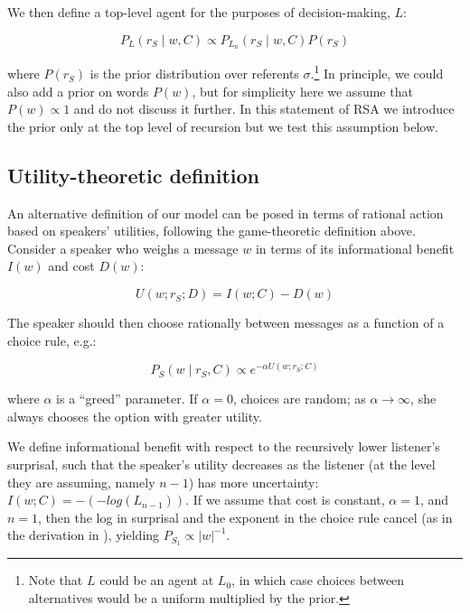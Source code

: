 \documentclass[man,noapacite]{apa2}
\begin{document}
We then define a top-level agent for the purposes of decision-making, $L$:

\begin{equation}
P_L (r_S \mid w, C) \propto P_{L_n} (r_S \mid w, C) P(r_S)
\end{equation}

\noindent where $P(r_S)$ is the prior distribution over referents $\sigma$.\footnote{Note that $L$ could be an agent at $L_0$, in which case choices between alternatives would be a uniform multiplied by the prior.} In principle, we could also add a prior on words $P(w)$, but for simplicity here we assume that $P(w) \propto 1$ and do not discuss it further. In this statement of RSA we introduce the prior only at the top level of recursion but we test this assumption below.

\subsection{Utility-theoretic definition}

An alternative definition of our model can be posed in terms of rational action based on speakers' utilities, following the game-theoretic definition above. Consider a speaker who weighs a message $w$ in terms of its informational benefit $I(w)$ and cost $D(w)$:

\begin{equation}
U(w; r_S; D) = I(w; C) - D(w)
\end{equation}

\noindent The speaker should then choose rationally between messages as a function of a choice rule, e.g.:

\begin{equation}
P_S(w \mid r_S, C) \propto e^{-\alpha U(w;r_S; C)}
\end{equation}

\noindent where $\alpha$ is a ``greed'' parameter. If $\alpha=0$, choices are random; as $\alpha \rightarrow \infty$, she always chooses the option with greater utility.

We define informational benefit with respect to the recursively lower listener's surprisal, such that the speaker's utility decreases as the listener (at the level they are assuming, namely $n-1$) has more uncertainty: $I(w; C) = -(-log(L_{n-1}))$. If we assume that cost is constant, $\alpha=1$, and $n=1$, then the log in surprisal and the exponent in the choice rule cancel (as in the derivation in ), yielding $P_{S_1} \propto |w|^{-1}$.
\end{document}
